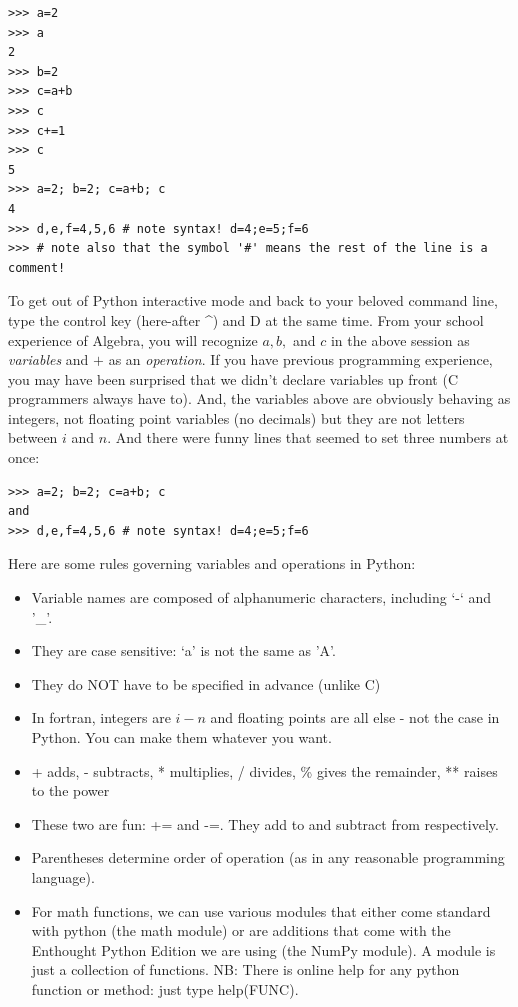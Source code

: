 \documentclass[11pt]{book}
\begin{document}
{{{ \color{blue} \begin{verbatim}
>>> a=2 
>>> a
2
>>> b=2
>>> c=a+b
>>> c
>>> c+=1
>>> c
5
>>> a=2; b=2; c=a+b; c
4
>>> d,e,f=4,5,6 # note syntax! d=4;e=5;f=6
>>> # note also that the symbol '#' means the rest of the line is a comment!
\end{verbatim}}

To get out of Python interactive mode and back to your beloved command line, type the control key (here-after  {\color{blue}\^{ }}) and  {\color{blue}D} at the same time.
From your  school experience of Algebra, you will recognize $a, b,$ and $c$ in the above session as {\it variables} and $+$ as an {\it operation}. If you have previous programming experience, you may have been surprised that we didn't declare variables up front (C programmers always have to).  And, the variables above are obviously behaving as integers, not floating point variables (no decimals) but they are not letters between $i$ and $n$.  And there were funny lines that seemed to set three numbers at once:

{ \color{blue} \begin{verbatim}
>>> a=2; b=2; c=a+b; c
and
>>> d,e,f=4,5,6 # note syntax! d=4;e=5;f=6
\end{verbatim}}
\noindent
Here are some rules governing variables and operations in Python:


\begin{itemize}
\item Variable names are composed of alphanumeric characters, including `-` and '\_'.
\item They are case sensitive:  `a' is not the same as 'A'.
\item They do NOT have to be specified in advance (unlike C)
\item In fortran, integers are  $i-n$ and floating points are all else - not the case in Python. You can make them whatever you want.  
\item + adds, - subtracts, * multiplies, / divides, \% gives the remainder, ** raises to the power
\item These two are fun: {\color{blue}+=} and  {\color{blue}-=}.  They add to and subtract from respectively. 
\item Parentheses determine order of operation (as in any reasonable programming language). 
\item  For math functions, we can use various modules that either come standard with python (the math module) or are additions that come with the Enthought Python Edition we are using (the NumPy module).  A module is just a collection of functions. NB:  There is online help for any python function or method:  just type help(FUNC). 
\end{itemize}


}}
\end{document}
